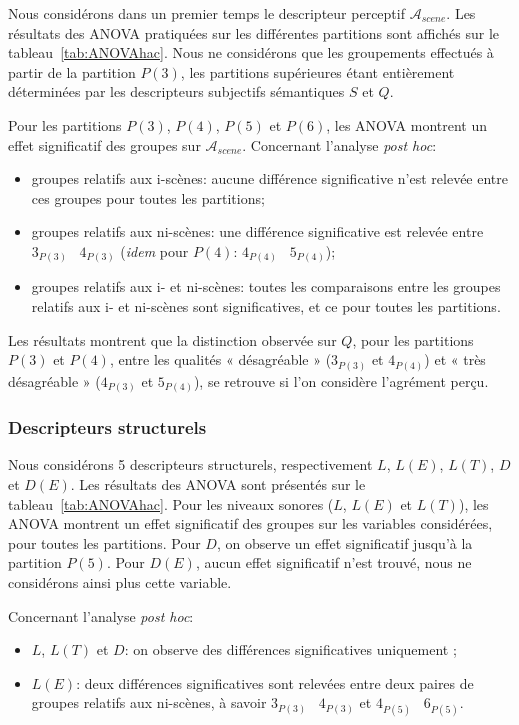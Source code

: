 Nous considérons dans un premier temps le descripteur perceptif $\mathcal{A}_{scene}$. Les résultats des ANOVA pratiquées sur les différentes partitions sont affichés sur le tableau~\ref{tab:ANOVAhac}. Nous ne considérons que les groupements effectués à partir de la partition $P(3)$, les partitions supérieures étant entièrement déterminées par les descripteurs subjectifs sémantiques $S$ et $Q$. 

Pour les partitions $P(3)$, $P(4)$, $P(5)$ et $P(6)$, les ANOVA montrent un effet significatif des groupes sur $\mathcal{A}_{scene}$. Concernant l'analyse \emph{post hoc}:

\begin{itemize}
\item groupes relatifs aux i-scènes: aucune différence significative n'est relevée entre ces groupes pour toutes les partitions;
\item groupes relatifs aux ni-scènes: une différence significative est relevée entre $3_{P(3)}$ \vs~$4_{P(3)}$ (\emph{idem} pour $P(4)$: $4_{P(4)}$ \vs~$5_{P(4)}$); 
\item groupes relatifs aux i- et ni-scènes: toutes les comparaisons entre les groupes relatifs aux i- et ni-scènes sont significatives, et ce pour toutes les partitions. 
\end{itemize}

Les résultats montrent que la distinction observée sur $Q$, pour les partitions $P(3)$ et $P(4)$, entre les qualités « désagréable » ($3_{P(3)}$ et $4_{P(4)}$) et « très désagréable » ($4_{P(3)}$ et $5_{P(4)}$), se retrouve si l'on considère l'agrément perçu. \\

\subsubsection{Descripteurs structurels}

Nous considérons 5 descripteurs structurels, respectivement $L$, $L(E)$, $L(T)$, $D$ et $D(E)$. Les résultats des ANOVA sont présentés sur le tableau~\ref{tab:ANOVAhac}. Pour les niveaux sonores ($L$, $L(E)$ et $L(T)$), les ANOVA montrent un effet significatif des groupes sur les variables considérées, pour toutes les partitions. Pour $D$, on observe un effet significatif jusqu’à la partition $P(5)$. Pour $D(E)$, aucun effet significatif n'est trouvé, nous ne considérons ainsi plus cette variable.

Concernant l'analyse \emph{post hoc}:

\begin{itemize}
\item $L$, $L(T)$ et $D$: on observe des différences significatives uniquement  ;
\item $L(E)$: deux différences significatives sont relevées entre deux paires de groupes relatifs aux ni-scènes, à savoir $3_{P(3)}$ \vs~$4_{P(3)}$ et $4_{P(5)}$ \vs~$6_{P(5)}$.
\end{itemize}

